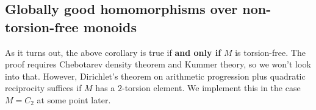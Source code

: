 \subsection*{Globally good homomorphisms over non-torsion-free monoids}

As it turns out, the above corollary is true if \textbf{and only if} $M$ is torsion-free.
The proof requires Chebotarev density theorem and Kummer theory, so we won't look into that.
However, Dirichlet's theorem on arithmetic progression plus quadratic reciprocity suffices if $M$ has a $2$-torsion element.
We implement this in the case $M = C_2$ at some point later.
